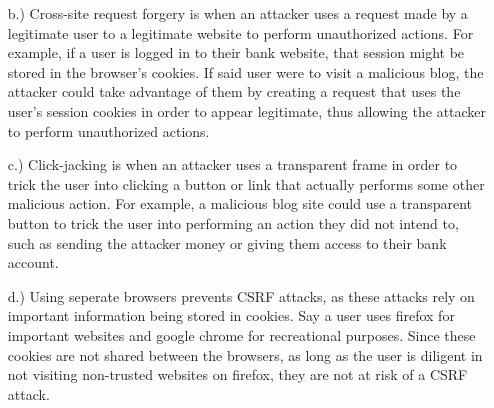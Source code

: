 \documentclass[11pt]{article}
\begin{document}
\begin{itemize}
\begin{itemize}
        \item [b.)] Cross-site request forgery is when an attacker uses a request made by a legitimate user to a legitimate website to perform unauthorized actions. For example, if a user is logged in to their bank website, that session might be stored in the browser's cookies. If said user were to visit a malicious blog, the attacker could take advantage of them by creating a request that uses the user's session cookies in order to appear legitimate, thus allowing the attacker to perform unauthorized actions.

        \item [c.)] Click-jacking is when an attacker uses a transparent frame in order to trick the user into clicking a button or link that actually performs some other malicious action. For example, a malicious blog site could use a transparent button to trick the user into performing an action they did not intend to, such as sending the attacker money or giving them access to their bank account.

        \item [d.)] Using seperate browsers prevents CSRF attacks, as these attacks rely on important information being stored in cookies. Say a user uses firefox for important websites and google chrome for recreational purposes. Since these cookies are not shared between the browsers, as long as the user is diligent in not visiting non-trusted websites on firefox, they are not at risk of a CSRF attack.
    \end{itemize}
\end{itemize}
\end{document}
